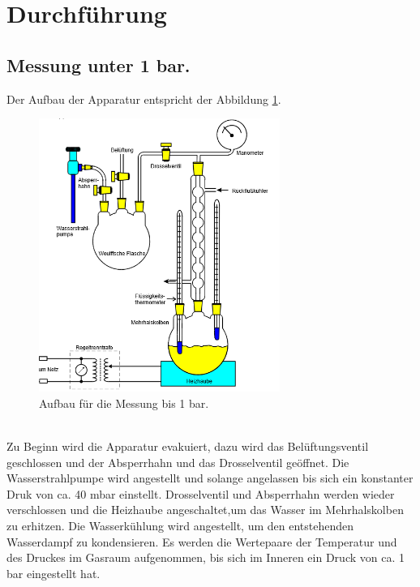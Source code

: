 \section{Durchführung}
\label{sec:Durchführung}
\subsection{Messung unter  1 bar.}
Der Aufbau der Apparatur entspricht der Abbildung \ref{fig:aufbau1}.
\begin{figure}
  \centering
  \includegraphics[width=0.7\textwidth]{aufbau1.PNG}
  \caption{Aufbau für die Messung bis 1 bar.}
  \label{fig:aufbau1}
\end{figure}\\
Zu Beginn wird die Apparatur evakuiert, dazu wird das
Belüftungsventil geschlossen und der Absperrhahn und das
Drosselventil geöffnet. Die Wasserstrahlpumpe wird angestellt
und solange angelassen bis sich ein konstanter Druk von ca. 40 mbar einstellt.
Drosselventil und Absperrhahn werden wieder verschlossen und die Heizhaube angeschaltet,um das Wasser im Mehrhalskolben zu erhitzen.
Die Wasserkühlung wird angestellt, um den entstehenden Wasserdampf zu kondensieren.
Es werden die Wertepaare der Temperatur und des Druckes im Gasraum aufgenommen,
bis sich im Inneren ein Druck von ca. 1 bar eingestellt hat.
\newpage
